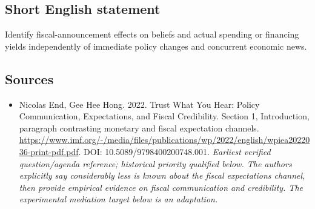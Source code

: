 \documentclass[11pt]{article}
\begin{document}
\subsection{Short English statement}
Identify fiscal-announcement effects on beliefs and actual spending or financing yields independently of immediate policy changes and concurrent economic news.

\subsection{Sources}
\begin{itemize}\raggedright
\item[\textnormal{[S1]}]\hypertarget{source:30007541:1}{} Nicolas End, Gee Hee Hong. 2022. Trust What You Hear: Policy Communication, Expectations, and Fiscal Credibility. Section 1, Introduction, paragraph contrasting monetary and fiscal expectation channels.
\url{https://www.imf.org/-/media/files/publications/wp/2022/english/wpiea2022036-print-pdf.pdf}.
DOI: 10.5089/9798400200748.001.
{\small\textit{Earliest verified question/agenda reference; historical priority qualified below. The authors explicitly say considerably less is known about the fiscal expectations channel, then provide empirical evidence on fiscal communication and credibility. The experimental mediation target below is an adaptation.}}
\end{itemize}
\end{document}
